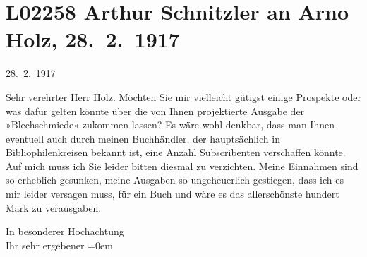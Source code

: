 

\section[Arthur Schnitzler an Arno Holz, 28. 2. 1917]{L02258 Arthur Schnitzler an Arno Holz, 28. 2. 1917}
\nopagebreak{}
\rehead{ }\normalsize\beginnumbering{}
\toendnotes[C]{\smallbreak\pagebreak[2]}
\toendnotes[C]{\smallbreak}
\pstart
           \raggedleft{}{\pb}28. 2. 1917\pend
           
\pstart\center{}Sehr verehrter Herr Holz.\pend\vspace{0.5em}
\pstart
           Möchten Sie mir vielleicht gütigst einige Prospekte oder was dafür gelten könnte über
               die von Ihnen projektierte Ausgabe der »Blechschmiede« zukommen lassen? Es wäre wohl denkbar, dass man Ihnen
               eventuell auch durch meinen Buchhändler, der hauptsächlich in Bibliophilenkreisen bekannt ist, eine
               Anzahl Subscribenten verschaffen könnte. Auf mich muss ich Sie leider bitten diesmal
               zu verzichten. Meine Einnahmen sind so erheblich gesunken, meine Ausgaben so
               ungeheuerlich gestiegen, dass \introOben{}ich\introOben{} es mir leider versagen
               muss, für ein Buch und wäre es das allerschönste hundert Mark zu verausgaben.\pend
           
\pstart
           In besonderer Hochachtung{\\[\baselineskip]} Ihr sehr ergebener\pend
           \leftskip=0em{}\endnumbering{}  
      